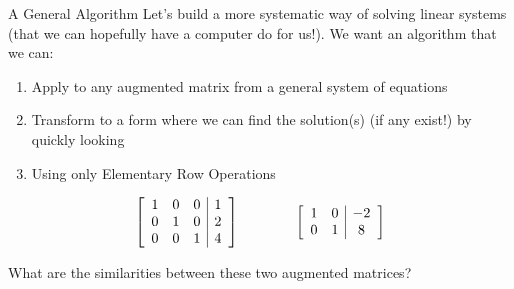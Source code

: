 \documentclass[xcoler=dvipsnames, aspectratio=169]{beamer}
\date{Row Echelon Form}
\begin{document}
    \begin{frame}{A General Algorithm}
        Let's build a more systematic way of solving linear systems (that we can hopefully 
        have a computer do for us!).
        We want an algorithm that we can:
        \pause
        \begin{enumerate}
            \item Apply to any augmented matrix from a general system of equations
                \pause
            \item Transform to a form where we can find the solution(s) (if any exist!) by quickly looking
                \pause
            \item Using only Elementary Row Operations
        \end{enumerate}
        \pause

        \[
            \aMat{ccc|c}{
                1 & 0 & 0 & 1\\
                0 & 1 & 0 & 2\\
                0 & 0 & 1 & 4
            }\qquad\qquad
            \aMat{cc|c}{
                1 & 0 & -2\\
                0 & 1 & 8\\
            }
        \]

        \begin{tcolorbox}
            What are the similarities between these two augmented matrices?
        \end{tcolorbox}
    \end{frame}
\end{document}
